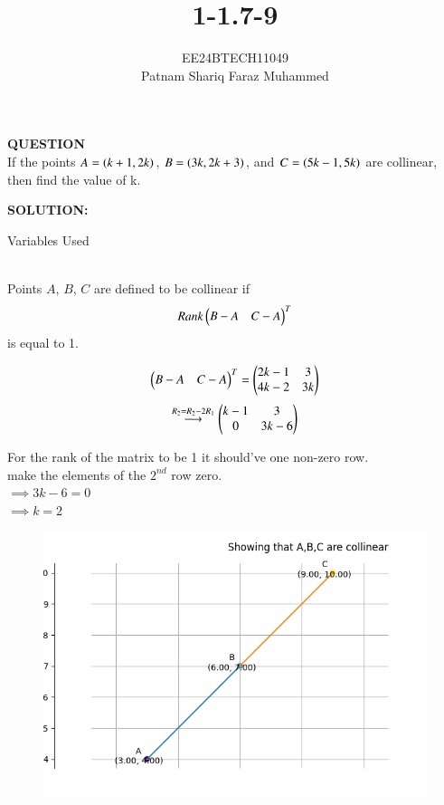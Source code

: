 \documentclass[journal]{IEEEtran}
\numberwithin{equation}{enumi}
\numberwithin{figure}{enumi}
\begin{document}


\title{1-1.7-9}
\author{EE24BTECH11049 \\ Patnam Shariq Faraz Muhammed}

{\let\newpage\relax\maketitle}

\textbf{QUESTION} \\
	If the points $A = \left(k + 1, 2k\right)$, $B = \left(3k, 2k + 3\right)$, and $C = \left(5k - 1, 5k\right)$ are collinear, then find the value of k.

\textbf{SOLUTION:} \\
\begin{table}[h!]    
  \centering
  
  \caption{Variables Used}
  \label{table: 1.7.9.1}
\end{table}\\
	
        Points $A$, $B$, $C$ are defined to be collinear if
        \begin{align*}
        Rank\begin{pmatrix}B - A & C - A\end{pmatrix}^{T}
        \end{align*}
        is equal to 1.

    
        \begin{center}
        \begin{align}
        \begin{pmatrix}B - A & C - A\end{pmatrix}^{T} = \begin{pmatrix}2k-1 & 3 \\ 4k-2 & 3k\end{pmatrix} 
        \end{align}
        \begin{align}
        \overset{R_2=R_2-2R_1}{\longrightarrow} \begin{pmatrix}k-1 & 3 \\ 0 & 3k-6\end{pmatrix}
        \end{align}
        
        For the rank of the matrix to be 1 it should've one non-zero row.\\ 
        make the elements of the $2^{nd}$ row zero.\\
        $\implies 3k-6 = 0$ \\
        $\implies k = 2$ \\
        \end{center}
        
        \begin{figure}[h]
        \centering
        \includegraphics[width=0.7\linewidth]{figs/fig.png}
        \caption{}
        \label{graph}
    	\end{figure}
\end{document}

